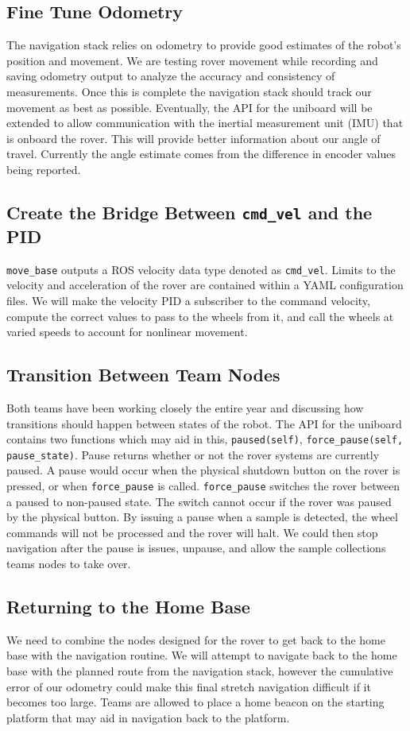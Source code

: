 \documentclass[10pt, oneside,onecolumn]{IEEEtran}
\begin{document}
\subsection{Fine Tune Odometry}
The navigation stack relies on odometry to provide good estimates of the robot's position and movement. We are testing rover movement while recording and saving odometry output to analyze the accuracy and consistency of measurements. Once this is complete the navigation stack should track our movement as best as possible. Eventually, the API for the uniboard will be extended to allow communication with the inertial measurement unit (IMU) that is onboard the rover. This will provide better information about our angle of travel. Currently the angle estimate comes from the difference in encoder values being reported. 

\subsection{Create the Bridge Between \texttt{cmd\_vel} and the PID}
\texttt{move\_base} outputs a ROS velocity data type denoted as \texttt{cmd\_vel}. Limits to the velocity and acceleration of the rover are contained within a YAML configuration files. We will make the velocity PID a subscriber to the command velocity, compute the correct values to pass to the wheels from it, and call the wheels at varied speeds to account for nonlinear movement. 

\subsection{Transition Between Team Nodes}
Both teams have been working closely the entire year and discussing how transitions should happen between states of the robot. The API for the uniboard contains two functions which may aid in this, \texttt{paused(self)}, \texttt{force\_pause(self, pause\_state)}. 
Pause returns whether or not the rover systems are currently paused. A pause would occur when the physical shutdown button on the rover is pressed, or when \texttt{force\_pause} is called. \texttt{force\_pause} switches the rover between a paused to non-paused state. The switch cannot occur if the rover was paused by the physical button. By issuing a pause when a sample is detected, the wheel commands will not be processed and the rover will halt. We could then stop navigation after the pause is issues, unpause, and allow the sample collections teams nodes to take over. 

\subsection{Returning to the Home Base}
We need to combine the nodes designed for the rover to get back to the home base with the navigation routine. We will attempt to navigate back to the home base with the planned route from the navigation stack, however the cumulative error of our odometry could make this final stretch navigation difficult if it becomes too large. Teams are allowed to place a home beacon on the starting platform that may aid in navigation back to the platform. 
\end{document}
